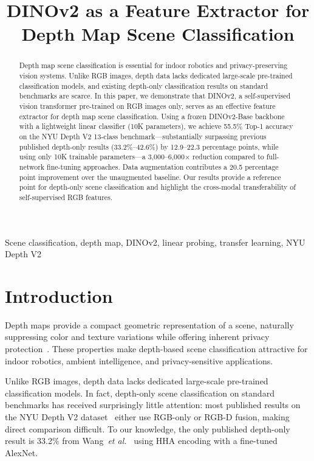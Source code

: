 \documentclass[conference, a4paper]{IEEEtran}
\title{DINOv2 as a Feature Extractor for \\ Depth Map Scene Classification}
\author{
    \IEEEauthorblockN{丁驿}
    \IEEEauthorblockA{武汉理工大学国际教育学院 \\
        Email: dyvertin@outlook.com
    }
}
\begin{document}
\maketitle

\begin{abstract}
Depth map scene classification is essential for indoor robotics and privacy-preserving vision systems.
Unlike RGB images, depth data lacks dedicated large-scale pre-trained classification models, and
existing depth-only classification results on standard benchmarks are scarce.
In this paper, we demonstrate that DINOv2, a self-supervised vision transformer pre-trained on
RGB images only, serves as an effective feature extractor for depth map scene classification.
Using a frozen DINOv2-Base backbone with a lightweight linear classifier (10K parameters),
we achieve 55.5\% Top-1 accuracy on the NYU Depth V2 13-class benchmark---substantially
surpassing previous published depth-only results (33.2\%--42.6\%) by 12.9--22.3
percentage points, while using only 10K trainable parameters---a 3,000--6,000$\times$
reduction compared to full-network fine-tuning approaches.
Data augmentation contributes a 20.5 percentage point improvement over the unaugmented baseline.
Our results provide a reference point for depth-only scene
classification and highlight the cross-modal transferability of self-supervised
RGB features.
\end{abstract}

\begin{IEEEkeywords}
Scene classification, depth map, DINOv2, linear probing, transfer learning, NYU Depth V2
\end{IEEEkeywords}

\section{Introduction}

Depth maps provide a compact geometric representation of a scene, naturally suppressing color and
texture variations while offering inherent privacy protection~\cite{robotics_depth}.
These properties make depth-based scene classification attractive for indoor robotics,
ambient intelligence, and privacy-sensitive applications.

Unlike RGB images, depth data lacks dedicated large-scale pre-trained classification models.
In fact, depth-only scene classification on standard benchmarks has received surprisingly
little attention: most published results on the NYU Depth V2 dataset~\cite{nyu_depth} either
use RGB-only or RGB-D fusion, making direct comparison difficult.
To our knowledge, the only published depth-only result is 33.2\% from Wang~\textit{et al.}~\cite{wang3d}
using HHA encoding with a fine-tuned AlexNet.
\end{document}
